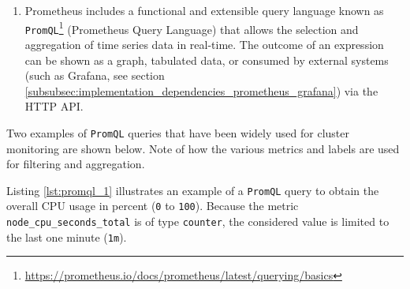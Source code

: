 \begin{enumerate}
\begin{enumerate}
\begin{enumerate}
          \item \texttt{Summary}
            \newline
            Similar to \texttt{Histogram} type, it also calculates configurable
            quantiles over a time window\footnote{\url{https://prometheus.io/docs/concepts/metric_types/\#summary}}.
        \end{enumerate}

      \item \texttt{Labels}
        \newline
        Labels allow Prometheus' dimensional data model: each given combination
        of labels for the same metric name identifies a unique dimensional
        instantiation of that metric. These dimensions can be used to filter and
        aggregate data by the \texttt{PromQL} query language.
        \newline
        For example, \lstinline[language=prometheus, alsoletter={_},
        morekeywords={node_cpu_seconds_total}, morekeywords={[2]{cpu, mode}}]|node_cpu_seconds_total{cpu="0",mode="idle"}|,
        determines the number of seconds spent in idle mode by CPU core 0.
    \end{enumerate}

  \item Prometheus includes a functional and extensible query language known as \texttt{PromQL}\footnote{\url{https://prometheus.io/docs/prometheus/latest/querying/basics}}
    (Prometheus Query Language) that allows the selection and aggregation of
    time series data in real-time. The outcome of an expression can be shown as a
    graph, tabulated data, or consumed by external systems (such as Grafana, see
    section \ref{subsubsec:implementation_dependencies_prometheus_grafana}) via
    the HTTP API\cite{prometheus_promql}.
\end{enumerate}

Two examples of \texttt{PromQL} queries that have been widely used for cluster monitoring
are shown below. Note of how the various metrics and labels are used for
filtering and aggregation.

Listing \ref{lst:promql_1} illustrates an example of a \texttt{PromQL} query to obtain
the overall CPU usage in percent (\texttt{0} to \texttt{100}). Because the
metric \lstinline[language=prometheus, alsoletter={_}, morekeywords={node_cpu_seconds_total}]{node_cpu_seconds_total}
is of type \texttt{counter}, the considered value is limited to the last one
minute (\texttt{1m}).

